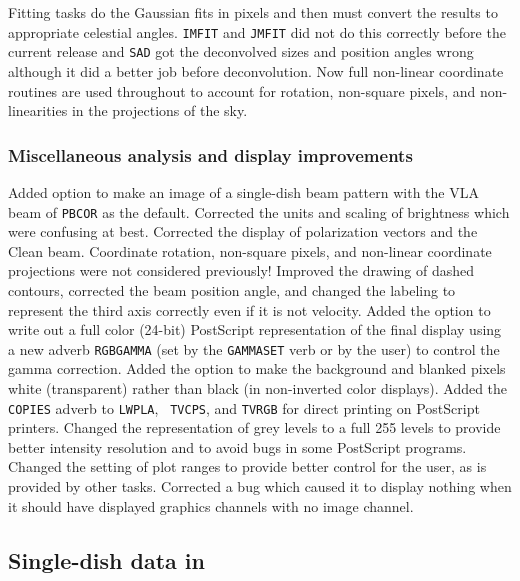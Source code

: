      Fitting tasks do the Gaussian fits in pixels and then must
convert the results to appropriate celestial angles.  {\tt IMFIT} and
{\tt JMFIT} did not do this correctly before the current release and
{\tt SAD} got the deconvolved sizes and position angles wrong although
it did a better job before deconvolution.  Now full non-linear
coordinate routines are used throughout to account for rotation,
non-square pixels, and non-linearities in the projections of the sky.

\subsubsection{Miscellaneous analysis and display improvements}

\begin{description}
 Added option to make an image of a single-dish beam
    pattern with the VLA beam of {\tt PBCOR} as the default.
 Corrected the units and scaling of brightness which
    were confusing at best.
 Corrected the display of polarization vectors and the
    Clean beam.  Coordinate rotation, non-square pixels, and
    non-linear coordinate projections were not considered previously!
 Improved the drawing of dashed contours, corrected the
    beam position angle, and changed the labeling to represent the
    third axis correctly even if it is not velocity.
 Added the option to write out a full color (24-bit)
    PostScript representation of the final display using a new adverb
    {\tt RGBGAMMA} (set by the {\tt GAMMASET} verb or by the user) to
    control the gamma correction.
 Added the option to make the background and blanked
    pixels white (transparent) rather than black (in non-inverted
    color displays).
 Added the {\tt COPIES} adverb to {\tt LWPLA}, {\tt
    TVCPS}, and {\tt TVRGB} for direct printing on PostScript
    printers.
 Changed the representation of grey levels to a full 255
    levels to provide better intensity resolution and to avoid bugs in
    some PostScript programs.
 Changed the setting of plot ranges to provide better
    control for the user, as is provided by other tasks.
 Corrected a bug which caused it to display nothing when
    it should have displayed graphics channels with no image channel.
\end{description}

\subsection{Single-dish data in \AIPS}

